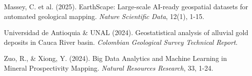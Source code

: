\documentclass[12pt,a4paper]{article}
\begin{document}
\begin{thebibliography}{9}

Massey, C. et al. (2025). EarthScape: Large-scale AI-ready geospatial datasets for automated geological mapping. \textit{Nature Scientific Data}, 12(1), 1-15.

Universidad de Antioquia \& UNAL (2024). Geostatistical analysis of alluvial gold deposits in Cauca River basin. \textit{Colombian Geological Survey Technical Report}.

Zuo, R., \& Xiong, Y. (2024). Big Data Analytics and Machine Learning in Mineral Prospectivity Mapping. \textit{Natural Resources Research}, 33, 1-24.

\end{thebibliography}
\end{document}
